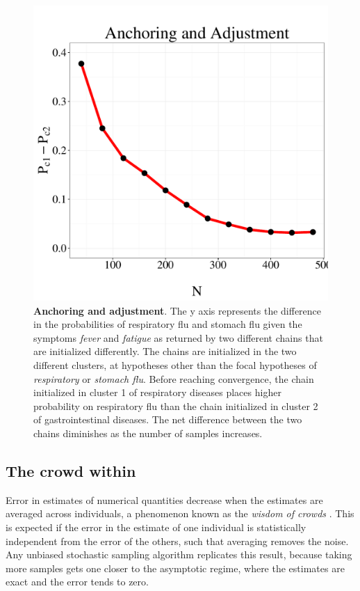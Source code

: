 \begin{figure}
\centering
\includegraphics[scale = 0.5]{figures/anchoring.pdf}
\caption{\textbf{Anchoring and adjustment}. The y axis represents the difference in the probabilities of respiratory flu and stomach flu given the symptoms \textit{fever} and \textit{fatigue} as returned by two different chains that are initialized differently. The chains are initialized in the two different clusters, at hypotheses other than the focal hypotheses of \textit{respiratory} or \textit{stomach flu}. Before reaching convergence, the chain initialized in cluster 1 of respiratory diseases places higher probability on respiratory flu than the chain initialized in cluster 2 of gastrointestinal diseases. The net difference between the two chains diminishes as the number of samples increases.}
\label{fig:anch}
\end{figure}

\subsection{The crowd within}

Error in estimates of numerical quantities decrease when the estimates are averaged across individuals, a phenomenon known as the \emph{wisdom of crowds} \citep{surowiecki2005wisdom}. This is expected if the error in the estimate of one individual is statistically independent from the error of the others, such that averaging removes the noise. Any unbiased stochastic sampling algorithm replicates this result, because taking more samples gets one closer to the asymptotic regime, where the estimates are exact and the error tends to zero.

